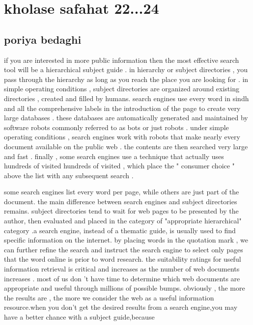 \documentclass [12pt]{beamer}
\begin{document}
\section*{kholase safahat 22...24}
\subsection*{poriya bedaghi}	
\begin{frame}
\justifying		
if you are interested in more public information then the most effective search tool will be a hierarchical subject guide . in hierarchy or subject directories , you pass through the hierarchy as long as you reach the place you are looking for . in simple operating conditions , subject directories are organized around existing directories , created and filled by humans. search engines use every word in sindh and all the comprehensive labels in the introduction of the page to create very large databases . these databases are automatically generated and maintained by software robots commonly referred to as bots or just robots . under simple operating conditions , search engines work with robots that make nearly every document available on the public web . the contents are then searched very large and fast . finally , some search engines use a technique that actually uses hundreds of visited hundreds of visited , which place the " consumer choice " above the list with any subsequent search .
\end{frame}

\begin{frame}

some search engines list every word per page, while others are just part of the document. the main difference between search engines and subject directories remains. subject directories tend to wait for web pages to be presented by the author, then evaluated and placed in the category of "appropriate hierarchical" category .a search engine, instead of a thematic guide, is usually used to find specific information on the internet. by placing words in the quotation mark , we can further refine the search and instruct the search engine to select only pages that the word online is prior to word research. the suitability ratings for useful information retrieval is critical and increases as the number of web documents increases . most of us don 't have time to determine which web documents are appropriate and useful through millions of possible bumps. obviously , the more the results are , the more we consider the web as a useful information resource.when you don't get the desired results from a search engine,you may have a better chance with a subject guide,because 
	
\end{frame}
\end{document}
